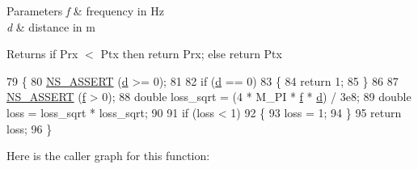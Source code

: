 \begin{DoxyParams}{Parameters}
{\em f} & frequency in Hz \\
\hline
{\em d} & distance in m\\
\hline
\end{DoxyParams}
\begin{DoxyReturn}{Returns}
if Prx $<$ Ptx then return Prx; else return Ptx 
\end{DoxyReturn}

\begin{DoxyCode}
79 \{
80   \hyperlink{assert_8h_a6dccdb0de9b252f60088ce281c49d052}{NS\_ASSERT} (\hyperlink{buildings__pathloss_8m_a9f9b934daed17a4d3613b6886ff4cf4b}{d} >= 0);
81 
82   \textcolor{keywordflow}{if} (\hyperlink{buildings__pathloss_8m_a9f9b934daed17a4d3613b6886ff4cf4b}{d} == 0)
83     \{
84       \textcolor{keywordflow}{return} 1;
85     \}
86 
87   \hyperlink{assert_8h_a6dccdb0de9b252f60088ce281c49d052}{NS\_ASSERT} (\hyperlink{buildings__pathloss_8m_aa52d3a6e3de5a80a97c12364caeaa125}{f} > 0);
88   \textcolor{keywordtype}{double} loss\_sqrt = (4 * M\_PI * \hyperlink{buildings__pathloss_8m_aa52d3a6e3de5a80a97c12364caeaa125}{f} * \hyperlink{buildings__pathloss_8m_a9f9b934daed17a4d3613b6886ff4cf4b}{d}) / 3e8;
89   \textcolor{keywordtype}{double} loss = loss\_sqrt * loss\_sqrt;
90 
91   \textcolor{keywordflow}{if} (loss < 1)
92     \{
93       loss = 1;
94     \}
95   \textcolor{keywordflow}{return} loss;
96 \}
\end{DoxyCode}


Here is the caller graph for this function\+:


